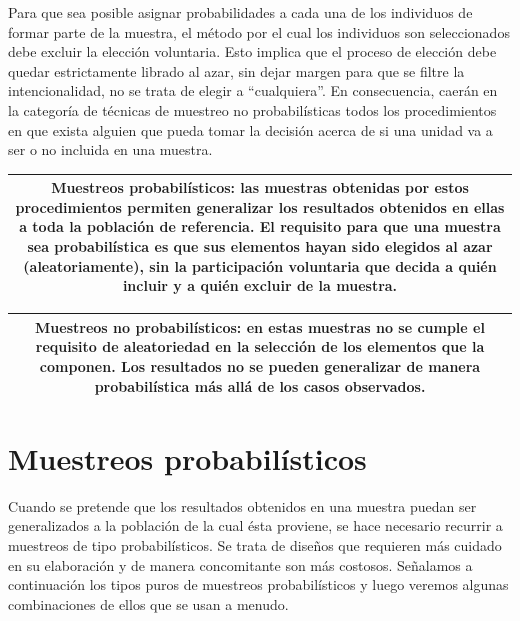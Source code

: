 \documentclass[]{book}
\begin{document}
Para que sea posible asignar probabilidades a cada una de los individuos
de formar parte de la muestra, el método por el cual los individuos son
seleccionados debe excluir la elección voluntaria. Esto implica que el
proceso de elección debe quedar estrictamente librado al azar, sin dejar
margen para que se filtre la intencionalidad, no se trata de elegir a
``cualquiera''. En consecuencia, caerán en la categoría de técnicas de
muestreo no probabilísticas todos los procedimientos en que exista
alguien que pueda tomar la decisión acerca de si una unidad va a ser o
no incluida en una muestra.

\begin{longtable}[]{@{}c@{}}
\toprule
\endhead
\begin{minipage}[t]{0.97\columnwidth}\centering
\textbf{Muestreos probabilísticos}: las muestras obtenidas por estos procedimientos permiten generalizar los resultados obtenidos en ellas a toda la población de referencia. El requisito para que una muestra sea probabilística es que sus elementos hayan sido elegidos al azar (aleatoriamente), sin la participación voluntaria que decida a quién incluir y a quién excluir de la muestra.\strut
\end{minipage}\tabularnewline
\bottomrule
\end{longtable}

\begin{longtable}[]{@{}c@{}}
\toprule
\endhead
\begin{minipage}[t]{0.97\columnwidth}\centering
\textbf{Muestreos no probabilísticos}: en estas muestras no se cumple el requisito de aleatoriedad en la selección de los elementos que la componen. Los resultados no se pueden generalizar de manera probabilística más allá de los casos observados.\strut
\end{minipage}\tabularnewline
\bottomrule
\end{longtable}

\hypertarget{muestreos-probabiluxedsticos}{%
\section{Muestreos probabilísticos}\label{muestreos-probabiluxedsticos}}

Cuando se pretende que los resultados obtenidos en una muestra puedan
ser generalizados a la población de la cual ésta proviene, se hace
necesario recurrir a muestreos de tipo probabilísticos. Se trata de
diseños que requieren más cuidado en su elaboración y de manera
concomitante son más costosos. Señalamos a continuación los tipos puros
de muestreos probabilísticos y luego veremos algunas combinaciones de
ellos que se usan a menudo.
\end{document}
